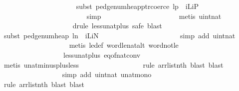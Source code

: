 \begin{isabellebody}
\ \ \ \ \ \ \ \ \ \ \ \ \ \ \ \ \ \ \ \ \isamarkupfalse%
\ {\isacharparenleft}subst\ pedge{\isacharunderscore}num{\isacharunderscore}heap{\isacharunderscore}ptr{\isacharunderscore}coerce{\isacharbrackleft}\ l{\isacharequal}p\ \ iL{\isacharequal}iP{\isacharbrackright}{\isacharparenright}\isanewline
\ \ \ \ \ \ \ \ \ \ \ \ \ \ \ \ \ \ \ \ \ \ \ \isamarkupfalse%
\ simp{\isacharplus}\isanewline
\ \ \ \ \ \ \ \ \ \ \ \ \ \ \ \ \ \ \ \ \isamarkupfalse%
\ {\isacharparenleft}metis\ uint{\isacharunderscore}nat{\isacharparenright}\isanewline
\ \ \ \ \ \ \ \ \ \ \ \ \ \ \ \ \ \ \ \isamarkupfalse%
\ {\isacharparenleft}drule\ less{\isacharunderscore}unat{\isacharunderscore}plus{}{\isacharcomma}\ safe{\isacharcomma}\ blast{\isacharparenright}\isanewline
\ \ \ \ \ \ \ \ \ \ \ \ \ \ \ \ \ \ \ \isamarkupfalse%
\ {\isacharparenleft}subst\ pedge{\isacharunderscore}num{\isacharunderscore}heap{\isacharbrackleft}\ l{\isacharequal}n\ \ iL{\isacharequal}iN{\isacharbrackright}{\isacharparenright}\isanewline
\ \ \ \ \ \ \ \ \ \ \ \ \ \ \ \ \ \ \ \ \ \isamarkupfalse%
\ {\isacharparenleft}simp\ add{\isacharcolon}\ uint{\isacharunderscore}nat{\isacharparenright}{\isacharplus}\isanewline
\ \ \ \ \ \ \ \ \ \ \ \ \ \ \ \ \ \ \isamarkupfalse%
\ {\isacharparenleft}metis\ le{\isacharunderscore}def\ word{\isacharunderscore}le{\isacharunderscore}nat{\isacharunderscore}alt\ word{\isacharunderscore}not{\isacharunderscore}le\ \isanewline
\ \ \ \ \ \ \ \ \ \ \ \ \ \ \ \ \ \ less{\isacharunderscore}unat{\isacharunderscore}plus{}\ eq{\isacharunderscore}of{\isacharunderscore}nat{\isacharunderscore}conv{\isacharparenright}\ \isanewline
\ \ \ \ \ \ \ \ \ \ \ \ \ \ \ \ \ \isamarkupfalse%
\ {\isacharparenleft}metis\ unat{\isacharunderscore}minus{\isacharunderscore}plus{}{\isacharunderscore}less{\isacharparenright}\isanewline
\ \ \ \ \ \ \ \ \ \ \ \ \ \ \ \ \isamarkupfalse%
\ {\isacharparenleft}rule\ arrlist{\isacharunderscore}nth{\isacharcomma}\ blast{\isacharcomma}\ blast{\isacharparenright}\ \isanewline
\ \ \ \ \ \ \ \ \ \ \ \ \ \ \ \ \isamarkupfalse%
\ {\isacharparenleft}simp\ add{\isacharcolon}\ uint{\isacharunderscore}nat\ unat{\isacharunderscore}mono{\isacharparenright}\ \isanewline
\ \ \ \ \ \ \ \ \ \ \ \ \ \ \ \isamarkupfalse%
\ {\isacharparenleft}rule\ arrlist{\isacharunderscore}nth{\isacharcomma}\ blast{\isacharcomma}\ blast{\isacharparenright}\isanewline

\end{isabellebody}
